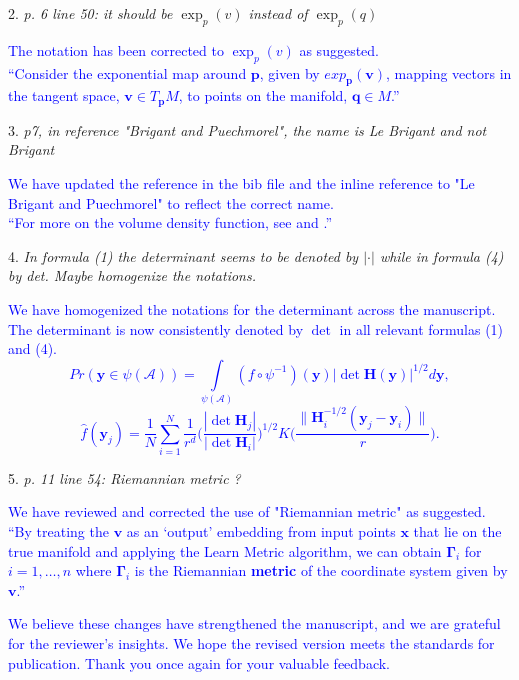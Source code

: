 \documentclass{article}
\begin{document}
2. \textit{p. 6 line 50: it should be \(\exp _{p}(v)\) instead of \(\exp _{p}(q)\)}

   \textcolor{blue}{
   The notation has been corrected to \(\exp_{p}(v)\) as suggested. \\
   ``Consider the exponential map around \(\bm{p}\), given by \(exp_{\bm{p}}(\bm{v})\), mapping vectors in the tangent space, \(\bm{v}\in T_{\bm{p}}M\), to points on the manifold, \(\bm{q}\in M\).''
   }

3. \textit{p7, in reference "Brigant and Puechmorel", the name is Le Brigant and not Brigant}

   \textcolor{blue}{
   We have updated the reference in the bib file and the inline reference to "Le Brigant and Puechmorel" to reflect the correct name. \\
   ``For more on the volume density function, see \textcite{Gallot2004-rc} and \textcite{Le_Brigant2019-lj}.''}

4. \textit{In formula (1) the determinant seems to be denoted by \(|\cdot|\) while in formula (4) by det. Maybe homogenize the notations.}

   \textcolor{blue}{
   We have homogenized the notations for the determinant across the manuscript. The determinant is now consistently denoted by \(\det\) in all relevant formulas (1) and (4). \\
   \begin{equation}
    \label{eq:changevar}
    Pr(\bm{y}\in\psi(\mathcal{A}))=\int\limits_{\psi(\mathcal{A})} (f\circ\psi^{-1})(\bm{y})|\det \bm{H}(\bm{y})|^{1/2}d\bm{y},
    \end{equation}
    \begin{equation}
    \label{eq:denestimator}
    \hat{f}(\bm{y}_j) = \frac{1}{N} \sum_{i=1}^{N} \frac{1}{r^d} \bigg(\frac{|\det \bm{H}_j|}{|\det \bm{H}_i|} \bigg)^{1/2} K\bigg( \frac{\| \bm{H}^{-1/2}_i (\bm{y}_j - \bm{y}_i)\|}{r} \bigg).
    \tag{4}
    \end{equation}
    }

5. \textit{p. 11 line 54: Riemannian metric ?}

   \textcolor{blue}{
   We have reviewed and corrected the use of "Riemannian metric" as suggested. \\
   ``By treating the \(\bm{v}\) as an `output' embedding from input points \(\bm{x}\) that lie on the true manifold and applying the Learn Metric algorithm, we can obtain \(\bm{\Gamma}_i\) for \(i=1,\dots,n\) where \(\bm{\Gamma}_i\) is the Riemannian \textbf{metric} of the coordinate system given by \(\bm{v}\).''
   }


\vspace{0.5cm}

\textcolor{blue}{We believe these changes have strengthened the manuscript, and we are grateful for the reviewer's insights. We hope the revised version meets the standards for publication. Thank you once again for your valuable feedback.}


\printbibliography

% 
% 
\end{document}
